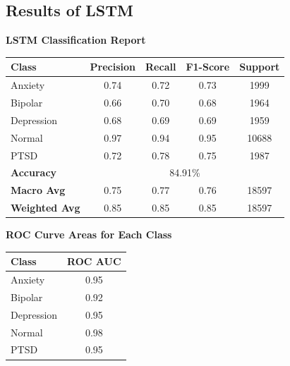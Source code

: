 \pagebreak

\subsection{Results of LSTM}

\begin{center}
    \textbf{LSTM Classification Report} \\[0.5em]
    \begin{tabular}{|l|c|c|c|c|}
        \hline
        \textbf{Class} & \textbf{Precision} & \textbf{Recall} & \textbf{F1-Score} & \textbf{Support} \\ \hline
        Anxiety        & 0.74               & 0.72            & 0.73              & 1999             \\ \hline
        Bipolar        & 0.66               & 0.70            & 0.68              & 1964             \\ \hline
        Depression     & 0.68               & 0.69            & 0.69              & 1959             \\ \hline
        Normal         & 0.97               & 0.94            & 0.95              & 10688            \\ \hline
        PTSD           & 0.72               & 0.78            & 0.75              & 1987             \\ \hline
        \textbf{Accuracy} & \multicolumn{4}{|c|}{84.91\%} \\ \hline
        \textbf{Macro Avg} & 0.75            & 0.77            & 0.76              & 18597            \\ \hline
        \textbf{Weighted Avg} & 0.85         & 0.85            & 0.85              & 18597            \\ \hline
    \end{tabular}
\end{center}

\vspace{0.1em}

\begin{center}
    \textbf{ROC Curve Areas for Each Class} \\[0.5em]
    \begin{tabular}{|l|c|}
        \hline
        \textbf{Class}  & \textbf{ROC AUC} \\ \hline
        Anxiety         & 0.95            \\ \hline
        Bipolar         & 0.92            \\ \hline
        Depression      & 0.95            \\ \hline
        Normal          & 0.98            \\ \hline
        PTSD            & 0.95            \\ \hline
    \end{tabular}
\end{center}

